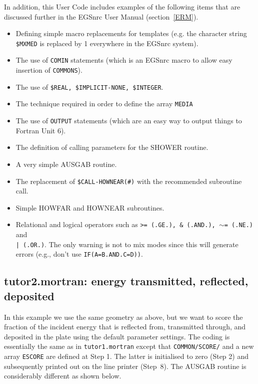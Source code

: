 In addition, this User Code includes examples of the following items
that are discussed further in the EGSnrc User Manual (section~\ref{ERM}). 
\begin{itemize} 
\item Defining simple macro replacements for templates
(e.g. the character string {\tt \$MXMED}
is replaced by 1 everywhere in the EGSnrc system).
%
\item The use of {\tt COMIN} statements (which is an EGSnrc macro to allow
easy insertion of {\tt COMMONS}).

\item The use of {\tt \$REAL, \$IMPLICIT-NONE, \$INTEGER}.
  
%
\item The technique required in order to define the array {\tt MEDIA}

\item The use of {\tt OUTPUT} statements (which are an easy way to output
things to Fortran Unit 6).
%
\item The definition of calling parameters for the SHOWER routine.
%
\item A very simple AUSGAB routine.

\item The replacement of {\tt \$CALL-HOWNEAR(\#)} with the recommended
subroutine call.
 
\item Simple HOWFAR and HOWNEAR subroutines. 

\item Relational and logical operators such as
{\tt >= (.GE.), \& (.AND.), $\sim$= (.NE.)} and\\ {\tt  | (.OR.)}.  The only
warning is not to mix modes since this will generate errors (e.g.,
don't use {\tt IF(A=B.AND.C=D))}. 
\end{itemize} 


\subsection{tutor2.mortran: energy transmitted, reflected, deposited}

In this example we use the same geometry as above, but we want to score
the fraction of the incident energy that is reflected from, transmitted
through, and deposited in the plate using the default parameter settings.
The coding is essentially the same as in {\tt tutor1.mortran} except that
{\tt COMMON/SCORE/} and a new array {\tt ESCORE} are defined at Step 1.
The latter is initialised to zero (Step 2) and subsequently printed
out on the line printer (Step~8).  The AUSGAB routine is considerably
different as shown below.

